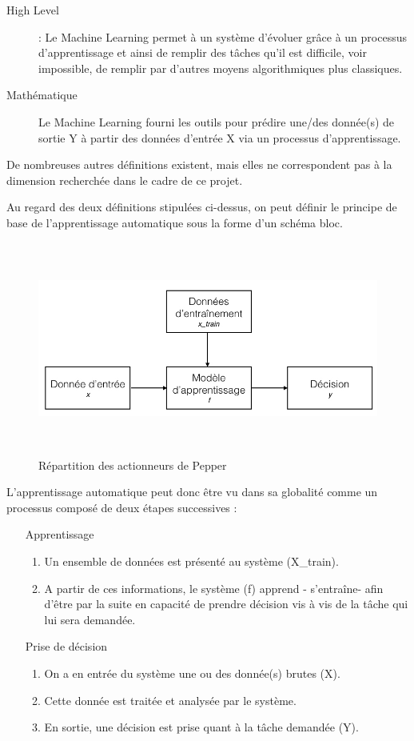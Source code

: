 \begin{description}
	\item[High Level]: Le Machine Learning permet à un système d'évoluer grâce à un processus d'apprentissage et ainsi de remplir des tâches qu'il est difficile, voir impossible, de remplir par d'autres moyens algorithmiques plus classiques. 
	\item[Mathématique] Le Machine Learning fourni les outils pour prédire une/des donnée(s) de sortie Y à partir des données d'entrée X via un processus d'apprentissage. 
\end{description}
 
 De nombreuses autres définitions existent, mais elles ne correspondent pas à la dimension recherchée dans le cadre de ce projet.
 
Au regard des deux définitions stipulées ci-dessus, on peut définir le principe de base de l'apprentissage automatique sous la forme d'un schéma bloc.

\begin{figure}[h]
	\centering\includegraphics[height=7cm]{images/ML_high_level.jpeg}
	\caption{Répartition des actionneurs de Pepper}
	\label{fig:Répartition des actionneurs de Pepper}
\end{figure}


L'apprentissage automatique peut donc être vu dans sa globalité comme un processus composé de deux étapes successives : 
\begin{enumerate}
		\item [Apprentissage]
		 \begin{enumerate}
			\item  Un ensemble de données est présenté au système (X\_train).
			\item A partir de ces informations, le système (f) apprend - s'entraîne- afin d'être par la suite en capacité de prendre décision vis à vis de la tâche qui lui sera demandée. 
		\end{enumerate}
		
		\item [Prise de décision] 
		\begin{enumerate}
			\item  On a en entrée du système une ou des donnée(s) brutes (X).  
			\item Cette donnée est traitée et analysée par le système.
			\item En sortie, une décision est prise quant à la tâche demandée (Y). 
		\end{enumerate}
\end{enumerate}

